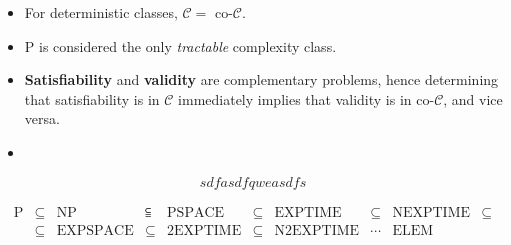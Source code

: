 \documentclass[a4paper,12pt]{article}
\begin{document}
\begin{itemize}
    \item 
    For deterministic classes, $\mathcal{C} = $ co-$\mathcal{C}$.

    \item $\mathrm{P}$ is considered the only \textit{tractable} complexity class.

    \item \textbf{Satisfiability} and \textbf{validity} are complementary problems, 
    hence determining that satisfiability is in $\mathcal{C}$ immediately implies that validity is in co-$\mathcal{C}$,  
    and vice versa.

    \item 
\end{itemize}


\[
    sdfasdfqweasdfs
\]


\[\begin{array}{ccccccccccccc}
    \mathrm{P} & \subseteq & \mathrm{NP} & \subseteqq & \mathrm{PSPACE} & \subseteq & \mathrm{EXPTIME} & \subseteq & \mathrm{NEXPTIME} & \subseteq \\   

    &  \subseteq & \mathrm{EXPSPACE} & \subseteq & \mathrm{2EXPTIME} & \subseteq & \mathrm{N2EXPTIME} & \cdots & \mathrm{ELEM} \\
\end{array}\]



\begin{figure}[ht!]
    \centering
\end{figure}


\vspace{1.5em}
\end{document}
